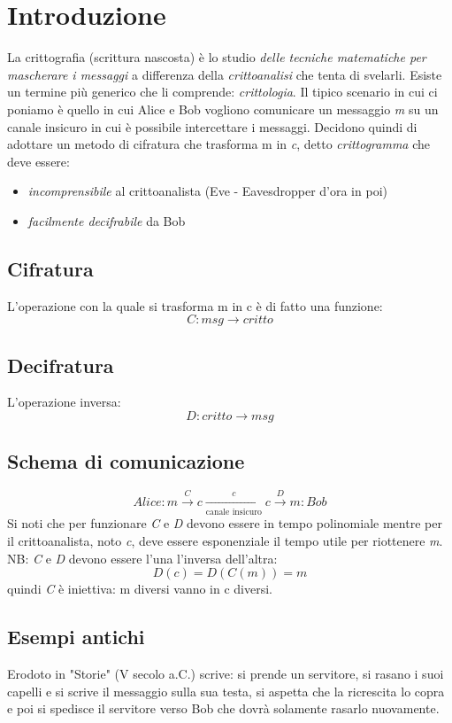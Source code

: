 \section{Introduzione}
La crittografia (scrittura nascosta) è lo studio \emph{delle tecniche matematiche per mascherare i messaggi} a differenza della \emph{crittoanalisi} che tenta di svelarli.
Esiste un termine più generico che li comprende: \emph{crittologia}.
Il tipico scenario in cui ci poniamo è quello in cui Alice e Bob vogliono comunicare un messaggio \emph{m} su un canale insicuro in cui è possibile intercettare i messaggi. Decidono quindi di adottare un metodo di cifratura che trasforma m in \emph{c}, detto \emph{crittogramma} che deve essere:

\begin{itemize}
    \item \emph{incomprensibile} al crittoanalista (Eve - Eavesdropper d'ora in poi)
    \item \emph{facilmente decifrabile} da Bob
\end{itemize}

\subsection{Cifratura}
L'operazione con la quale si trasforma m in c è di fatto una funzione:
$$
    C: msg \longrightarrow critto
$$

\subsection{Decifratura}
L'operazione inversa:
$$
    D: critto \longrightarrow msg
$$

\subsection{Schema di comunicazione}
$$
    Alice: m \xrightarrow{C} c \xrightarrow[\text{canale insicuro}]{c} c \xrightarrow{D} m :Bob
$$
Si noti che per funzionare \emph{C} e \emph{D} devono essere in tempo polinomiale mentre per il crittoanalista, noto \emph{c}, deve essere esponenziale il tempo utile per riottenere \emph{m}.
NB: \emph{C} e \emph{D} devono essere l'una l'inversa dell'altra:
$$
    D(c) = D(C(m)) = m
$$
quindi \emph{C} è iniettiva: m diversi vanno in c diversi.

\subsection{Esempi antichi}
Erodoto in "Storie" (V secolo a.C.) scrive:
si prende un servitore, si rasano i suoi capelli e si scrive il messaggio sulla sua testa, si aspetta che la ricrescita lo copra e poi si spedisce il servitore verso Bob che dovrà solamente rasarlo nuovamente.

